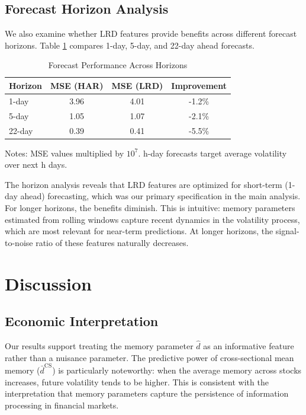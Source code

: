\documentclass[12pt,a4paper]{article}
\begin{document}
\subsection{Forecast Horizon Analysis}

We also examine whether LRD features provide benefits across different forecast horizons. Table \ref{tab:horizons} compares 1-day, 5-day, and 22-day ahead forecasts.

\begin{table}[htbp]
\centering
\caption{Forecast Performance Across Horizons}
\label{tab:horizons}
\small
\begin{tabular}{lccc}
\toprule
Horizon & MSE (HAR) & MSE (LRD) & Improvement \\
\midrule
1-day & 3.96 & 4.01 & -1.2\% \\
5-day & 1.05 & 1.07 & -2.1\% \\
22-day & 0.39 & 0.41 & -5.5\% \\
\bottomrule
\end{tabular}
\begin{tablenotes}\small
\item Notes: MSE values multiplied by $10^7$. h-day forecasts target average volatility over next h days.
\end{tablenotes}
\end{table}

The horizon analysis reveals that LRD features are optimized for short-term (1-day ahead) forecasting, which was our primary specification in the main analysis. For longer horizons, the benefits diminish. This is intuitive: memory parameters estimated from rolling windows capture recent dynamics in the volatility process, which are most relevant for near-term predictions. At longer horizons, the signal-to-noise ratio of these features naturally decreases.

\section{Discussion}
\label{sec:discussion}

\subsection{Economic Interpretation}

Our results support treating the memory parameter $\hat{d}$ as an informative feature rather than a nuisance parameter. The predictive power of cross-sectional mean memory ($\bar{d}^{\text{CS}}$) is particularly noteworthy: when the average memory across stocks increases, future volatility tends to be higher. This is consistent with the interpretation that memory parameters capture the persistence of information processing in financial markets.
\end{document}
